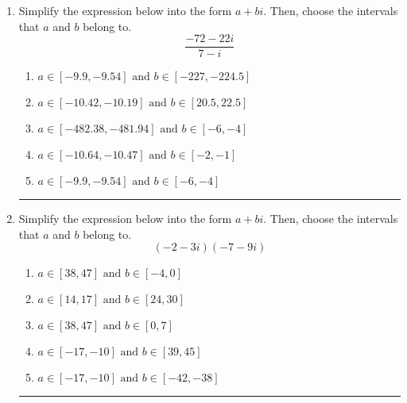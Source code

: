 \documentclass[14pt]{extbook}
\newcommand{\litem}[1]{\item#1\hspace*{-1cm}\rule{\textwidth}{0.4pt}}
\begin{document}
\begin{enumerate}
{\begin{enumerate}[label=\Alph*.]
\end{enumerate} }
\litem{
Simplify the expression below into the form $a+bi$. Then, choose the intervals that $a$ and $b$ belong to.\[ \frac{-72 - 22 i}{7 - i} \]\begin{enumerate}[label=\Alph*.]
\item \( a \in [-9.9, -9.54] \text{ and } b \in [-227, -224.5] \)
\item \( a \in [-10.42, -10.19] \text{ and } b \in [20.5, 22.5] \)
\item \( a \in [-482.38, -481.94] \text{ and } b \in [-6, -4] \)
\item \( a \in [-10.64, -10.47] \text{ and } b \in [-2, -1] \)
\item \( a \in [-9.9, -9.54] \text{ and } b \in [-6, -4] \)

\end{enumerate} }
\litem{
Simplify the expression below into the form $a+bi$. Then, choose the intervals that $a$ and $b$ belong to.\[ (-2 - 3 i)(-7 - 9 i) \]\begin{enumerate}[label=\Alph*.]
\item \( a \in [38, 47] \text{ and } b \in [-4, 0] \)
\item \( a \in [14, 17] \text{ and } b \in [24, 30] \)
\item \( a \in [38, 47] \text{ and } b \in [0, 7] \)
\item \( a \in [-17, -10] \text{ and } b \in [39, 45] \)
\item \( a \in [-17, -10] \text{ and } b \in [-42, -38] \)

\end{enumerate} }
\end{enumerate}
\end{document}
